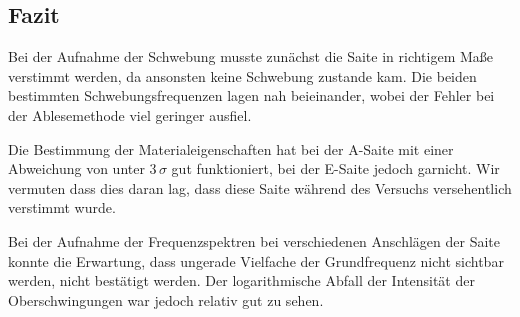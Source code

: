 \documentclass[a4paper, 11pt]{article}
\begin{document}
\subsection{Fazit}
Bei der Aufnahme der Schwebung musste zunächst die Saite in richtigem Maße verstimmt werden, da ansonsten keine Schwebung zustande kam. Die beiden bestimmten Schwebungsfrequenzen lagen nah beieinander, wobei der Fehler bei der Ablesemethode viel geringer ausfiel.

Die Bestimmung der Materialeigenschaften hat bei der A-Saite mit einer Abweichung von unter $3\,\sigma$ gut funktioniert, bei der E-Saite jedoch garnicht. Wir vermuten dass dies daran lag, dass diese Saite während des Versuchs versehentlich verstimmt wurde.

Bei der Aufnahme der Frequenzspektren bei verschiedenen Anschlägen der Saite konnte die Erwartung, dass ungerade Vielfache der Grundfrequenz nicht sichtbar werden, nicht bestätigt werden. Der logarithmische Abfall der Intensität der Oberschwingungen war jedoch relativ gut zu sehen.

\clearpage
\end{document}
